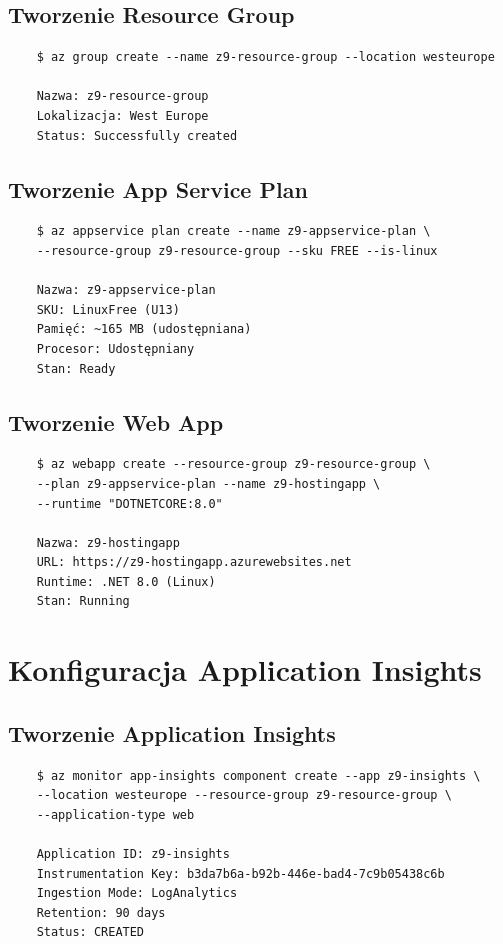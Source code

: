 \documentclass[twoside]{article}
\begin{document}
\subsection{Tworzenie Resource Group}

\begin{verbatim}
	$ az group create --name z9-resource-group --location westeurope
	
	Nazwa: z9-resource-group
	Lokalizacja: West Europe
	Status: Successfully created
\end{verbatim}

\subsection{Tworzenie App Service Plan}

\begin{verbatim}
	$ az appservice plan create --name z9-appservice-plan \
	--resource-group z9-resource-group --sku FREE --is-linux
	
	Nazwa: z9-appservice-plan
	SKU: LinuxFree (U13)
	Pamięć: ~165 MB (udostępniana)
	Procesor: Udostępniany
	Stan: Ready
\end{verbatim}

\subsection{Tworzenie Web App}

\begin{verbatim}
	$ az webapp create --resource-group z9-resource-group \
	--plan z9-appservice-plan --name z9-hostingapp \
	--runtime "DOTNETCORE:8.0"
	
	Nazwa: z9-hostingapp
	URL: https://z9-hostingapp.azurewebsites.net
	Runtime: .NET 8.0 (Linux)
	Stan: Running
\end{verbatim}

\section{Konfiguracja Application Insights}

\subsection{Tworzenie Application Insights}

\begin{verbatim}
	$ az monitor app-insights component create --app z9-insights \
	--location westeurope --resource-group z9-resource-group \
	--application-type web
	
	Application ID: z9-insights
	Instrumentation Key: b3da7b6a-b92b-446e-bad4-7c9b05438c6b
	Ingestion Mode: LogAnalytics
	Retention: 90 days
	Status: CREATED
\end{verbatim}
\end{document}
